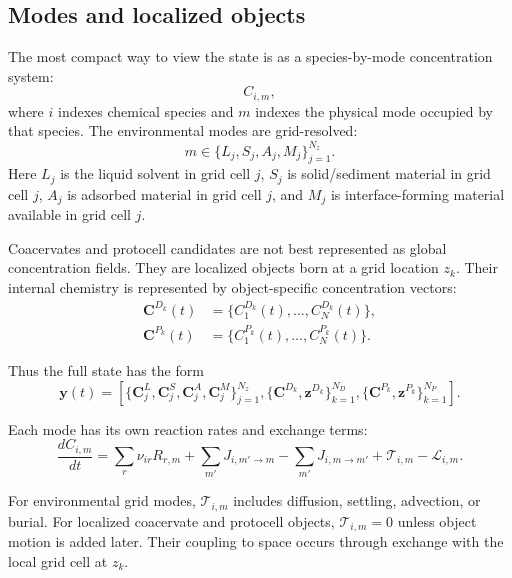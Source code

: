 \documentclass[11pt]{article}
\begin{document}
\subsection{Modes and localized objects}

The most compact way to view the state is as a species-by-mode concentration system:
\begin{equation}
C_{i,m},
\end{equation}
where $i$ indexes chemical species and $m$ indexes the physical mode occupied by that species. The environmental modes are grid-resolved:
\begin{equation}
m\in\{L_j,S_j,A_j,M_j\}_{j=1}^{N_z}.
\end{equation}
Here $L_j$ is the liquid solvent in grid cell $j$, $S_j$ is solid/sediment material in grid cell $j$, $A_j$ is adsorbed material in grid cell $j$, and $M_j$ is interface-forming material available in grid cell $j$.

Coacervates and protocell candidates are not best represented as global concentration fields. They are localized objects born at a grid location $z_k$. Their internal chemistry is represented by object-specific concentration vectors:
\begin{align}
\mathbf{C}^{D_k}(t) &= \{C_1^{D_k}(t),\ldots,C_N^{D_k}(t)\},\\
\mathbf{C}^{P_k}(t) &= \{C_1^{P_k}(t),\ldots,C_N^{P_k}(t)\}.
\end{align}

Thus the full state has the form
\begin{equation}
\mathbf{y}(t)
=
\left[
\{\mathbf{C}^{L}_j,\mathbf{C}^{S}_j,\mathbf{C}^{A}_j,\mathbf{C}^{M}_j\}_{j=1}^{N_z},
\{\mathbf{C}^{D_k},\mathbf{z}^{D_k}\}_{k=1}^{N_D},
\{\mathbf{C}^{P_k},\mathbf{z}^{P_k}\}_{k=1}^{N_P}
\right].
\end{equation}

Each mode has its own reaction rates and exchange terms:
\begin{equation}
\frac{dC_{i,m}}{dt}
=
\sum_r \nu_{ir}R_{r,m}
+
\sum_{m'}J_{i,m'\rightarrow m}
-
\sum_{m'}J_{i,m\rightarrow m'}
+
\mathcal{T}_{i,m}
-
\mathcal{L}_{i,m}.
\end{equation}

For environmental grid modes, $\mathcal{T}_{i,m}$ includes diffusion, settling, advection, or burial. For localized coacervate and protocell objects, $\mathcal{T}_{i,m}=0$ unless object motion is added later. Their coupling to space occurs through exchange with the local grid cell at $z_k$.
\end{document}
